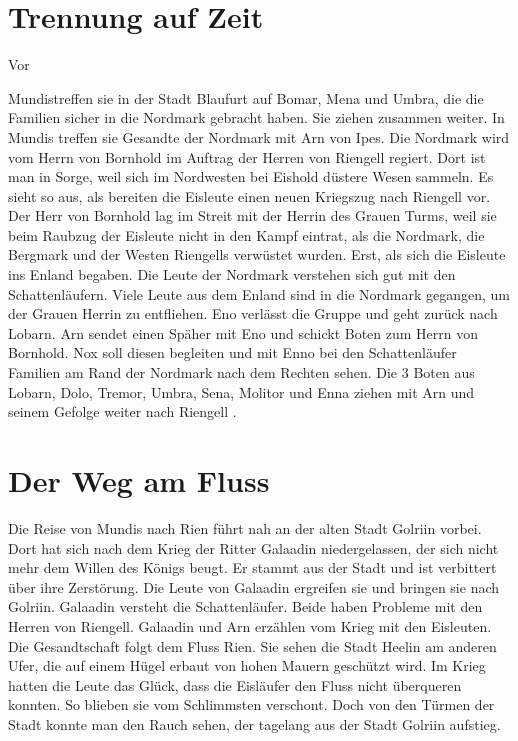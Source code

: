 \documentclass[12pt,a4paper,onecolumn,twoside,ngerman]{book}
\newcommand{\Molitor}{Molitor}
\newcommand{\Sena}{Sena}
\newcommand{\Enland}{Enland}
\newcommand{\Schattenlaufer}{Schattenläufer}
\newcommand{\Eno}{Eno}
\newcommand{\Bomar}{Bomar}
\newcommand{\Dolo}{Dolo}
\newcommand{\Nox}{Nox}
\newcommand{\Mena}{Mena}
\newcommand{\Umbra}{Umbra}
\newcommand{\Enna}{Enna}
\newcommand{\Enno}{Enno}
\newcommand{\Tremor}{Tremor}
\newcommand{\Lobarn}{Lobarn}
\newcommand{\Nordmark}{Nordmark}
\newcommand{\Bergmark}{Bergmark}
\newcommand{\Ipes}{Ipes}
\newcommand{\Bornhold}{Bornhold}
\newcommand{\Eishold}{Eishold}
\newcommand{\Arn}{Arn}
\newcommand{\Eislaufer}{Eisläufer}
\newcommand{\Eisleute}{Eisleute}
\newcommand{\Rhingell}{Riengell}
\newcommand{\Blaufurt}{Blaufurt}
\newcommand{\Mundis}{Mundis}
\newcommand{\Helin}{Heelin}
\newcommand{\Golrin}{Golriin}
\newcommand{\Galadin}{Galaadin}
\newcommand{\Rhin}{Rien}
\begin{document}
\section{Trennung auf Zeit}
Vor {\Mundis  treffen sie in der Stadt {\Blaufurt}  auf {\Bomar}, {\Mena} und {\Umbra}, die die Familien sicher in die {\Nordmark} gebracht haben. Sie ziehen zusammen weiter. In {\Mundis} treffen sie Gesandte der {\Nordmark} mit {\Arn} von {\Ipes}. Die {\Nordmark} wird vom Herrn von {\Bornhold} im Auftrag der Herren von {\Rhingell} regiert. Dort ist man in Sorge, weil sich im Nordwesten bei {\Eishold} düstere Wesen sammeln. Es sieht so aus, als bereiten die {\Eisleute} einen neuen Kriegszug nach {\Rhingell} vor.\linebreak
Der Herr von {\Bornhold} lag im Streit mit der Herrin des Grauen Turms, weil sie beim Raubzug der {\Eisleute}  nicht in den Kampf eintrat, als die {\Nordmark}, die {\Bergmark} und der Westen {\Rhingell}s verwüstet wurden. Erst, als sich die {\Eisleute} ins {\Enland} begaben.\linebreak
Die Leute der {\Nordmark} verstehen sich gut mit den {\Schattenlaufer}n. Viele Leute aus dem {\Enland} sind in die {\Nordmark} gegangen, um der Grauen Herrin zu entfliehen.\linebreak
{\Eno} verlässt die Gruppe und geht zurück nach {\Lobarn}. {\Arn} sendet einen Späher mit {\Eno} und schickt  Boten zum Herrn von {\Bornhold}. {\Nox} soll diesen begleiten und mit {\Enno} bei den {\Schattenlaufer}    Familien am Rand der {\Nordmark} nach dem Rechten sehen. Die 3 Boten aus {\Lobarn}, {\Dolo}, {\Tremor}, {\Umbra}, {\Sena}, {\Molitor} und {\Enna} ziehen mit {\Arn} und seinem Gefolge weiter nach {\Rhingell} . 

\section{Der Weg am Fluss}
Die Reise von {\Mundis}  nach {\Rhin} führt nah an der alten Stadt {\Golrin} vorbei.\linebreak
Dort hat sich nach dem Krieg der Ritter {\Galadin} niedergelassen, der sich nicht mehr dem Willen des Königs beugt. Er stammt aus der Stadt und ist verbittert über ihre Zerstörung.\linebreak
Die Leute von {\Galadin}  ergreifen sie und bringen sie nach {\Golrin}. {\Galadin} versteht die {\Schattenlaufer}. Beide haben Probleme mit den Herren von {\Rhingell}. {\Galadin} und {\Arn} erzählen vom Krieg mit den Eisleuten.\linebreak 
Die Gesandtschaft folgt dem Fluss {\Rhin}. Sie sehen die Stadt {\Helin} am anderen Ufer, die auf einem Hügel erbaut von hohen Mauern geschützt wird. Im Krieg hatten die Leute das Glück, dass die {\Eislaufer} den Fluss nicht überqueren konnten. So blieben sie vom Schlimmsten verschont. Doch von den Türmen der Stadt konnte man den Rauch sehen, der tagelang aus der Stadt {\Golrin} aufstieg. 

}
\end{document}

